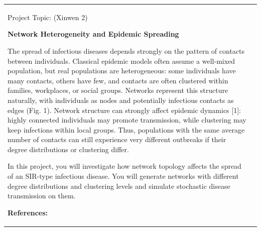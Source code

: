 \documentclass[a4paper,landscape]{article}
\newlength{\HeaderSize}
\newlength{\HeaderSizeBaseline}
\newlength{\SectionSize}
\newlength{\SectionSizeBaseline}
\newlength{\TextSize}
\newlength{\TextSizeBaseline}
\newlength{\vskipHeader}
\newlength{\vskipSection}
\newlength{\vskipText}
\newlength{\LeftPanel}
\newlength{\PanelGap}
\newlength{\RightPanel}
\begin{document}
\noindent
\begin{tabular}{@{}p{\LeftPanel}@{\hspace{\PanelGap}}p{\RightPanel}@{}}

\parbox[t][\LeftPanel][t]{\LeftPanel}{%

\begin{center}
  {\fontsize{\HeaderSize}{\HeaderSizeBaseline}\selectfont\color{topicblue}%
   Project Topic:\hspace{9mm} (Xinwen 2)} 
\end{center}

\vspace{\vskipHeader}

{\fontsize{\SectionSize}{\SectionSizeBaseline}\selectfont\bfseries 
%
Network Heterogeneity and Epidemic Spreading
\par}
\vspace{\vskipSection}

{\fontsize{\TextSize}{\TextSizeBaseline}\selectfont
%
The spread of infectious diseases depends strongly on the pattern of contacts between individuals. Classical epidemic models often assume a well-mixed population, but real populations are heterogeneous: some individuals have many contacts, others have few, and contacts are often clustered within families, workplaces, or social groups. Networks represent this structure naturally, with individuals as nodes and potentially infectious contacts as edges (Fig. 1). Network structure can strongly affect epidemic dynamics [1]: highly connected individuals may promote transmission, while clustering may keep infections within local groups. Thus, populations with the same average number of contacts can still experience very different outbreaks if their degree distributions or clustering differ.
\par

\vspace{\vskipText}
In this project, you will investigate how network topology affects the spread of an SIR-type infectious disease. You will generate networks with different degree distributions and clustering levels and simulate stochastic disease transmission on them. 
\par
}

\vfill
\vspace{\vskipSection}
{\fontsize{\SectionSize}{\SectionSizeBaseline}\selectfont\bfseries References:\par}
\vspace{\vskipSection}

}
\end{tabular}
\end{document}
